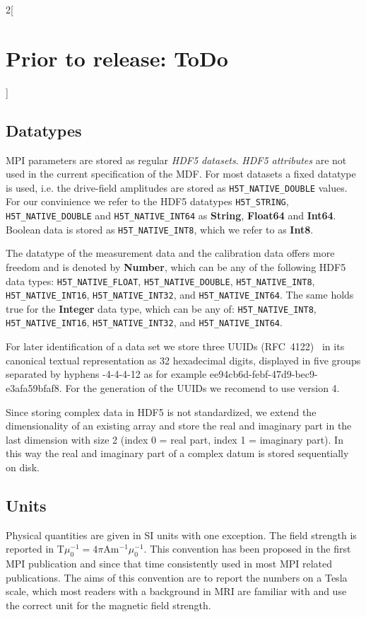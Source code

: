 \documentclass[landscape,a4paper]{article} %
\newcommand{\inl}[1]{\lstinline[columns=fixed]{#1}}
\newcommand{\inltab}[1]{{\ttfamily\bfseries\color{blue}#1}}
\newcommand{\inlvar}[1]{{\ttfamily#1}}
\begin{document}
\begin{multicols}{2}[\section{Prior to release: ToDo}]
\subsection{Datatypes}

MPI parameters are stored as regular \textit{HDF5 datasets}. \textit{HDF5 attributes} are not used in the current specification of the MDF. For most datasets a fixed datatype is used, i.e. the drive-field amplitudes are stored as \inl{H5T_NATIVE_DOUBLE} values. For our convinience we refer to the HDF5 datatypes \inl{H5T_STRING}, \inl{H5T_NATIVE_DOUBLE} and \inl{H5T_NATIVE_INT64} as \inltab{String}, \inltab{Float64} and \inltab{Int64}. Boolean data is stored as \inl{H5T_NATIVE_INT8}, which we refer to as \inltab{Int8}.

The datatype of the measurement data and the calibration data offers more freedom and is denoted by \inltab{Number}, which can be any of the following HDF5 data types: \inl{H5T_NATIVE_FLOAT}, \mbox{\inl{H5T_NATIVE_DOUBLE},} \inl{H5T_NATIVE_INT8}, \inl{H5T_NATIVE_INT16}, \inl{H5T_NATIVE_INT32}, and \inl{H5T_NATIVE_INT64}. The same holds true for the \inltab{Integer} data type, which can be any of: \inl{H5T_NATIVE_INT8}, \inl{H5T_NATIVE_INT16}, \inl{H5T_NATIVE_INT32}, and \inl{H5T_NATIVE_INT64}. 

For later identification of a data set we store three UUIDs (RFC~4122)~\cite{leach2005universally} in its canonical textual representation as 32 hexadecimal digits, displayed in five groups separated by hyphens \inlvar{8-4-4-4-12} as for example \inlvar{ee94cb6d-febf-47d9-bec9-e3afa59bfaf8}. For the generation of the UUIDs we recomend to use version 4.

Since storing complex data in HDF5 is not standardized, we extend the dimensionality of an existing array and store the real and imaginary part in the last dimension with size 2 (index 0 = real part, index 1 = imaginary part). In this way the real and imaginary part of a complex datum is stored sequentially on disk.

\subsection{Units}

Physical quantities are given in SI units with one exception. The field strength is reported in T$\mu_0^{-1} = 4 \pi$Am$^{-1}\mu_0^{-1}$. This convention has been proposed in the first MPI publication \cite{Gleich2005} and since that time consistently used in most MPI related publications. The aims of this convention are to report the numbers on a Tesla scale, which most readers with a background in MRI are familiar with and use the correct unit for the magnetic field strength.


\end{multicols}
\end{document}
